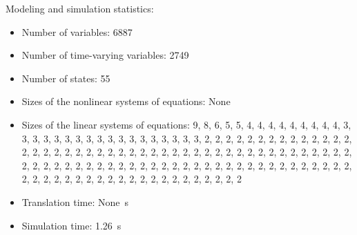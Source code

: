 \begin{contextbox}
  Modeling and simulation statistics:
  \begin{itemize}
    \item Number of variables: 6887
    \item Number of time-varying variables: 2749
    \item Number of states: 55
    \item Sizes of the nonlinear systems of equations: None
    \item Sizes of the linear systems of equations: 9, 8, 6, 5, 5, 4, 4, 4, 4, 4, 4, 4, 4, 4, 3, 3, 3, 3, 3, 3, 3, 3, 3, 3, 3, 3, 3, 3, 3, 3, 3, 3, 2, 2, 2, 2, 2, 2, 2, 2, 2, 2, 2, 2, 2, 2, 2, 2, 2, 2, 2, 2, 2, 2, 2, 2, 2, 2, 2, 2, 2, 2, 2, 2, 2, 2, 2, 2, 2, 2, 2, 2, 2, 2, 2, 2, 2, 2, 2, 2, 2, 2, 2, 2, 2, 2, 2, 2, 2, 2, 2, 2, 2, 2, 2, 2, 2, 2, 2, 2, 2, 2, 2, 2, 2, 2, 2, 2, 2, 2, 2, 2, 2, 2, 2, 2, 2, 2, 2, 2, 2, 2, 2, 2, 2, 2, 2, 2, 2
    \item Translation time: \SI{None}{s}
    \item Simulation time: \SI{1.26}{s}
  \end{itemize}
\end{contextbox}